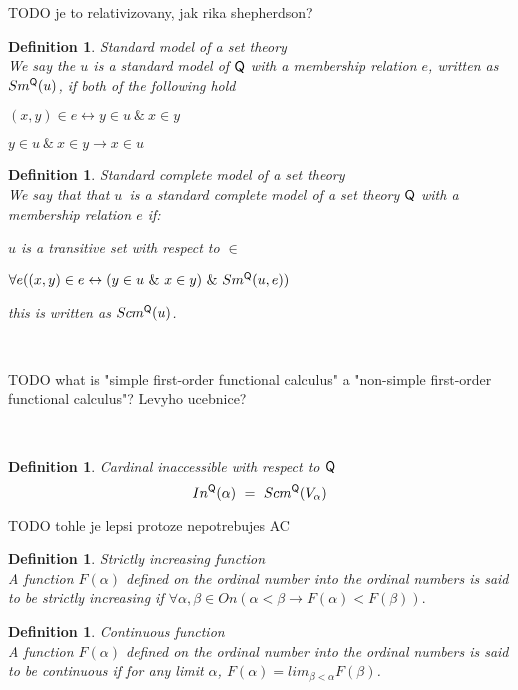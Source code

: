\documentclass[12pt,a4paper]{article}
\newtheorem{definition}[theorem]{Definition}
\renewcommand{\iff}{\leftrightarrow}
\newcommand{\then}{\rightarrow}
\newcommand{\bce}{\begin{compactenum}}
\newcommand{\ece}{\end{compactenum}}
\begin{document}
TODO je to relativizovany, jak rika shepherdson?
\begin{definition}{Standard model of a set theory}\\
We say the $u$ is a standard model of $\sf{Q}$ with a membership relation $e$, written as $Sm^{\sf{Q}}(u)$, if both of the following hold
\bce[(i)]
\item $(x, y) \in e \iff y \in u\ \&\ x \in y$
\item $y \in u\ \&\ x \in y \then x \in u$
\ece
\end{definition}
\begin{definition}{Standard complete model of a set theory}\\
We say that that $u$ is a standard complete model of a set theory $\sf{Q}$ with a membership relation $e$ if:
\bce[(i)]
\item $u$ is a transitive set with respect to $\in$
\item $\forall e ((x, y) \in e \iff (y \in u\ \&\ x \in y)\ \&\ Sm^{\sf{Q}}(u, e))$
\ece
this is written as $Scm^{\sf{Q}}(u)$.
\end{definition}

\

TODO what is "simple first-order functional calculus" a "non-simple first-order functional calculus"? Levyho ucebnice?

\

\begin{definition}{Cardinal inaccessible with respect to $\sf{Q}$}\label{def:levy_inaccessible}
\begin{equation}
In^{\sf{Q}}(\alpha)\ =\ Scm^{\sf{Q}}(V_\alpha)
\end{equation}
\end{definition}

TODO tohle je lepsi protoze nepotrebujes AC


\begin{definition}{Strictly increasing function}\\
A function $F(\alpha)$ defined on the ordinal number into the ordinal numbers is said to be \emph{strictly increasing} if
$\forall \alpha, \beta \in On (\alpha < \beta \then F(\alpha) < F(\beta)).$
\end{definition}

\begin{definition}{Continuous function}\\
A function $F(\alpha)$ defined on the ordinal number into the ordinal numbers is said to be \emph{continuous} if
for any limit $\alpha$, $F(\alpha) = lim_{\beta < \alpha} F(\beta)$.
\end{definition}
\end{document}
